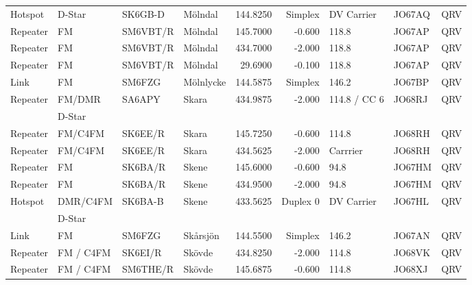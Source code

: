 \begin{longtable}{llllrrlll}
Hotspot  & D-Star    & SK6GB-D  & Mölndal           & 144.8250     & Simplex    & DV Carrier   & JO67AQ      & QRV      \\
Repeater & FM        & SM6VBT/R & Mölndal           & 145.7000     & -0.600     & 118.8        & JO67AP      & QRV      \\
Repeater & FM        & SM6VBT/R & Mölndal           & 434.7000     & -2.000     & 118.8        & JO67AP      & QRV      \\
Repeater & FM        & SM6VBT/R & Mölndal           & 29.6900      & -0.100     & 118.8        & JO67AP      & QRV      \\
Link     & FM        & SM6FZG   & Mölnlycke         & 144.5875     & Simplex    & 146.2        & JO67BP      & QRV      \\
Repeater & FM/DMR    & SA6APY   & Skara             & 434.9875     & -2.000     & 114.8 / CC 6 & JO68RJ      & QRV      \\
         & D-Star    &          &                   &              &            &              &             &          \\
Repeater & FM/C4FM   & SK6EE/R  & Skara             & 145.7250     & -0.600     & 114.8        & JO68RH      & QRV      \\
Repeater & FM/C4FM   & SK6EE/R  & Skara             & 434.5625     & -2.000     & Carrrier     & JO68RH      & QRV      \\
Repeater & FM        & SK6BA/R  & Skene             & 145.6000     & -0.600     & 94.8         & JO67HM      & QRV      \\
Repeater & FM        & SK6BA/R  & Skene             & 434.9500     & -2.000     & 94.8         & JO67HM      & QRV      \\
Hotspot  & DMR/C4FM  & SK6BA-B  & Skene             & 433.5625     & Duplex 0   & DV Carrier   & JO67HL      & QRV      \\
         & D-Star    &          &                   &              &            &              &             &          \\
Link     & FM        & SM6FZG   & Skårsjön          & 144.5500     & Simplex    & 146.2        & JO67AN      & QRV      \\
Repeater & FM / C4FM & SK6EI/R  & Skövde            & 434.8250     & -2.000     & 114.8        & JO68VK      & QRV      \\
Repeater & FM / C4FM & SM6THE/R & Skövde            & 145.6875     & -0.600     & 114.8        & JO68XJ      & QRV      \\

\end{longtable}
